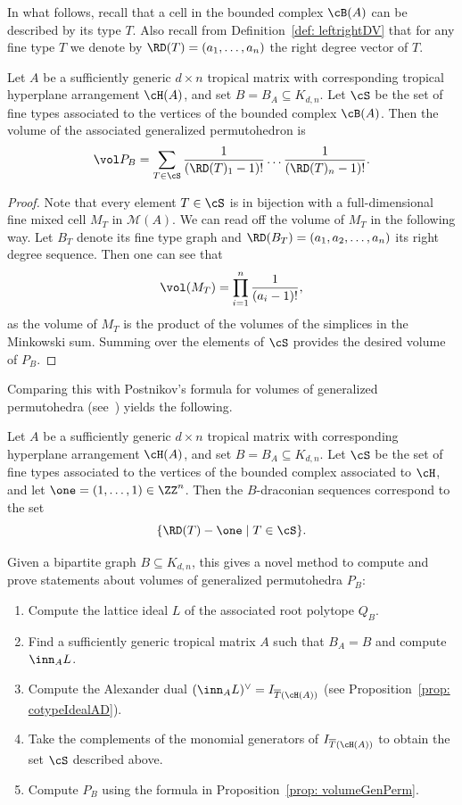 In what follows, recall that a cell in the bounded complex $\cB(A)$ can be described by its type $T$.  Also recall from Definition~\ref{def: leftrightDV} that for any fine type $T$ we denote by $\RD(T) = (a_1,\dots, a_n)$ the right degree vector of $T$.

\begin{prop}\label{prop: volumeGenPerm}
Let $A$ be a sufficiently generic $d\times n$ tropical matrix with corresponding tropical hyperplane arrangement $\cH(A)$, and set $B = B_A\subseteq K_{d,n}$. Let $\cS$ be the set of fine types associated to the vertices of the bounded complex $\cB(A)$. 
Then the volume of the associated generalized permutohedron is
$$
\vol P_B = \sum_{T\in \cS} \frac{1}{(\RD(T)_1 - 1)!} \dots \frac{1}{(\RD(T)_n - 1)!}.
$$
\end{prop}

\begin{proof}
Note that every element $T\in \cS$ is in bijection with a full-dimensional fine mixed cell $M_T$ in ${\mathcal M}(A)$. We can read off the volume of $M_T$ in the following way. Let $B_T$ denote its fine type graph and $\RD(B_T) = (a_1, a_2, \dots, a_n)$ its right degree sequence.  Then one can see that 
\[\vol(M_T)= \prod_{i=1}^n \frac{1}{(a_i - 1)!},\]
\noindent
as the volume of $M_T$ is the product of the volumes of the simplices in the Minkowski sum.
Summing over the elements of $\cS$ provides the desired volume of $P_B$.
\end{proof}

Comparing this with Postnikov's formula for volumes of generalized permutohedra (see~\cite[Theorem 9.3]{postnikov2009permutohedra}) yields the following.

\begin{cor}
Let $A$ be a sufficiently generic $d\times n$ tropical matrix with corresponding hyperplane arrangement $\cH(A)$, and set $B = B_A\subseteq K_{d,n}$. Let $\cS$ be the set of fine types associated to the vertices of the bounded complex associated to $\cH$, and let $\one = (1,\dots, 1)\in \ZZ^n$. Then the $B$-draconian sequences correspond to the set
$$
\{\RD(T)-\one \mid T\in \cS \}.
$$
\end{cor}

Given a bipartite graph $B\subseteq K_{d,n}$, this gives a novel method to compute and prove statements about volumes of generalized permutohedra $P_B$:
\begin{enumerate}
    \item Compute the lattice ideal $L$ of the associated root polytope $Q_B$.
    \item Find a sufficiently generic tropical matrix $A$ such that $B_A = B$ and compute $\inn_A L$.
    \item Compute the Alexander dual $(\inn_A L)^\vee = I_{\overline{T}(\cH(A))}$ (see Proposition~\ref{prop: cotypeIdealAD}).
    \item Take the complements of the monomial generators of $I_{\overline{T}(\cH(A))}$ to obtain the set $\cS$ described above.
    \item Compute $P_B$ using the formula in Proposition~\ref{prop: volumeGenPerm}.
\end{enumerate}

